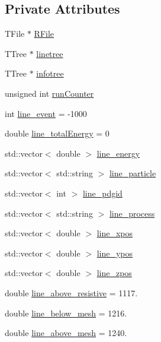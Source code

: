 \subsection*{Private Attributes}
\begin{DoxyCompactItemize}
\item 
T\+File $\ast$ \hyperlink{classUMRootSaver_ad7ffe5037296689e41b7c161afa3cee3}{R\+File}
\item 
T\+Tree $\ast$ \hyperlink{classUMRootSaver_a29e193f625e575fdbbb87af833959260}{linetree}
\item 
T\+Tree $\ast$ \hyperlink{classUMRootSaver_a2480f54d6b0013cc940e00b242508747}{infotree}
\item 
unsigned int \hyperlink{classUMRootSaver_a99af4bcf69b6a924398e5f9f4c55dd0f}{run\+Counter}
\item 
int \hyperlink{classUMRootSaver_aa2a036666d57184757bf92a30fa92a01}{line\+\_\+event} = -\/1000
\item 
double \hyperlink{classUMRootSaver_ab4ce203238d77838c94d6e79c8da7627}{line\+\_\+total\+Energy} = 0
\item 
std\+::vector$<$ double $>$ \hyperlink{classUMRootSaver_a3306ae5496af585da4cfcb7b814add17}{line\+\_\+energy}
\item 
std\+::vector$<$ std\+::string $>$ \hyperlink{classUMRootSaver_a238095e0ad1a8ffb1c8234dbd8498267}{line\+\_\+particle}
\item 
std\+::vector$<$ int $>$ \hyperlink{classUMRootSaver_a2a2b886dd46e2c58518a77d17c699ef4}{line\+\_\+pdgid}
\item 
std\+::vector$<$ std\+::string $>$ \hyperlink{classUMRootSaver_a7314b2dbee08811d7c0ffe8da8e6a139}{line\+\_\+process}
\item 
std\+::vector$<$ double $>$ \hyperlink{classUMRootSaver_a2050b402447a170697da61679df4083e}{line\+\_\+xpos}
\item 
std\+::vector$<$ double $>$ \hyperlink{classUMRootSaver_a987f396719a5013af8b6e8ef181ff102}{line\+\_\+ypos}
\item 
std\+::vector$<$ double $>$ \hyperlink{classUMRootSaver_a614b0676af3c14b3539d39dae29ae32e}{line\+\_\+zpos}
\item 
double \hyperlink{classUMRootSaver_add592e7355abbae18ec766a482fcf051}{line\+\_\+above\+\_\+resistive} = 1117.
\item 
double \hyperlink{classUMRootSaver_a3eaefa9c88dfb35ad31f9cbe696deb5d}{line\+\_\+below\+\_\+mesh} = 1216.
\item 
double \hyperlink{classUMRootSaver_ae741b38eda489eefddb6bed3295bf857}{line\+\_\+above\+\_\+mesh} = 1240.

\end{DoxyCompactItemize}
